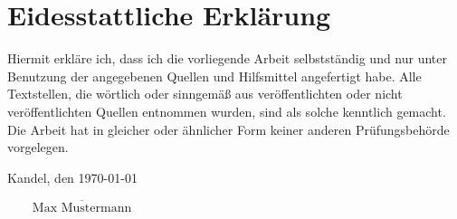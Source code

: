 %
%

\chapter*{Eidesstattliche Erklärung}
\thispagestyle{empty}
Hiermit erkläre ich, dass ich die vorliegende Arbeit selbstständig und nur unter Benutzung der angegebenen Quellen und Hilfsmittel angefertigt habe. Alle Textstellen, die wörtlich oder sinngemäß aus veröffentlichten oder nicht veröffentlichten Quellen entnommen wurden, sind als solche kenntlich gemacht. Die Arbeit hat in gleicher oder ähnlicher Form keiner anderen Prüfungsbehörde vorgelegen.
 \vspace{2\baselineskip}

\noindent Kandel, den \today
\begin{flushright}
$\overline{~~~~~~~~~\mbox{Max Mustermann}~~~~~~~~~}$
\end{flushright}